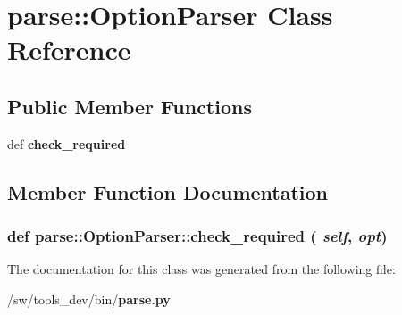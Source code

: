 \section{parse::OptionParser Class Reference}
\label{classparse_1_1OptionParser}
\subsection*{Public Member Functions}
\begin{CompactItemize}
\item 
def {\bf check\_\-required}
\end{CompactItemize}


\subsection{Member Function Documentation}
\subsubsection{\setlength{\rightskip}{0pt plus 5cm}def parse::OptionParser::check\_\-required ( {\em self},  {\em opt})}\label{classparse_1_1OptionParser_6ec73fba3483f468e44dd527a4865190}




The documentation for this class was generated from the following file:\begin{CompactItemize}
\item 
/sw/tools\_\-dev/bin/{\bf parse.py}\end{CompactItemize}
